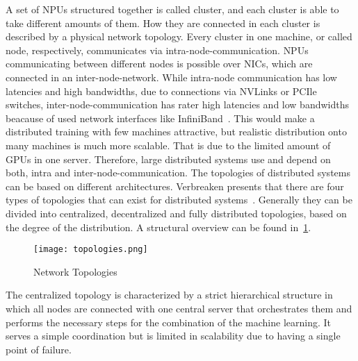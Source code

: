 A set of \acp{NPU} structured together is called cluster, and each cluster is able to take different amounts of them. How they are connected in each cluster is described by a physical network topology. Every cluster in one machine, or called node, respectively, communicates via intra-node-communication. \acp{NPU} communicating between different nodes is possible over \acp{NIC}, which are connected in an inter-node-network.
While intra-node communication has low latencies and high bandwidths, due to connections via NVLinks or PCIle switches, inter-node-communication has rater high latencies and low bandwidths beacause of used network interfaces like InfiniBand~\cite{gangidi_rdma_2024}. %
This would make a distributed training with few machines attractive, but realistic distribution onto many machines is much more scalable.
That is due to the limited amount of \acp{GPU} in one server. %
Therefore, large distributed systems use and depend on both, intra and inter-node-communication.
The topologies of distributed systems can be based on different architectures. Verbreaken presents that there are four types of topologies that can exist for distributed systems~\cite{verbraeken_survey_2020}. Generally they can be divided into centralized, decentralized and fully distributed topologies, based on the degree of the distribution. A structural overview can be found in~\ref{fig:topologies}.


\begin{figure}[H]  %
  \centering
  \texttt{[image: topologies.png]}
  \caption{Network Topologies}
  \label{fig:topologies}
\end{figure}

The centralized topology is characterized by a strict hierarchical structure in which all nodes are connected with one central server that orchestrates them and performs the necessary steps for the combination of the machine learning. It serves a simple coordination but is limited in scalability due to having a single point of failure.

